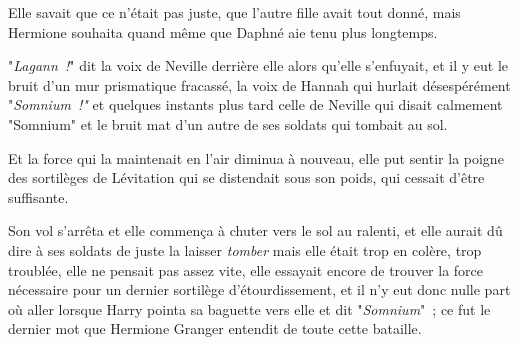 \later

Elle savait que ce n'était pas juste, que l'autre fille avait tout donné, mais Hermione souhaita quand même que Daphné aie tenu plus longtemps.

"\emph{Lagann~!}" dit la voix de Neville derrière elle alors qu'elle s'enfuyait, et il y eut le bruit d'un mur prismatique fracassé, la voix de Hannah qui hurlait désespérément "\emph{Somnium~!"} et quelques instants plus tard celle de Neville qui disait calmement "Somnium" et le bruit mat d'un autre de ses soldats qui tombait au sol.

Et la force qui la maintenait en l'air diminua à nouveau, elle put sentir la poigne des sortilèges de Lévitation qui se distendait sous son poids, qui cessait d'être suffisante.

Son vol s'arrêta et elle commença à chuter vers le sol au ralenti, et elle aurait dû dire à ses soldats de juste la laisser \emph{tomber} mais elle était trop en colère, trop troublée, elle ne pensait pas assez vite, elle essayait encore de trouver la force nécessaire pour un dernier sortilège d'étourdissement, et il n'y eut donc nulle part où aller lorsque Harry pointa sa baguette vers elle et dit "\emph{Somnium}"~; ce fut le dernier mot que Hermione Granger entendit de toute cette bataille. 


